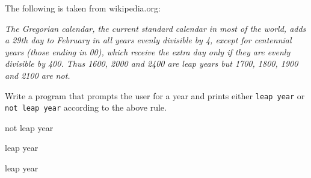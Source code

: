 The following is taken from wikipedia.org:

{\it The Gregorian calendar, the current standard calendar in most of the 
world, adds a 29th day to February in all years evenly divisible by 4, 
except for centennial years (those ending in 00), which receive the extra 
day only if they are evenly divisible by 400. Thus 1600, 2000 and 2400 
are leap years but 1700, 1800, 1900 and 2100 are not.}

Write a program that prompts the user for a year and prints either 
\verb!leap year! or \verb!not leap year! according to the above rule.

\resett
\nextt
\begin{console}[commandchars=\\\{\}]
not leap year
\end{console}

\nextt
\begin{console}[commandchars=\\\{\}]
leap year
\end{console}

\nextt
\begin{console}[commandchars=\\\{\}]
leap year
\end{console}
